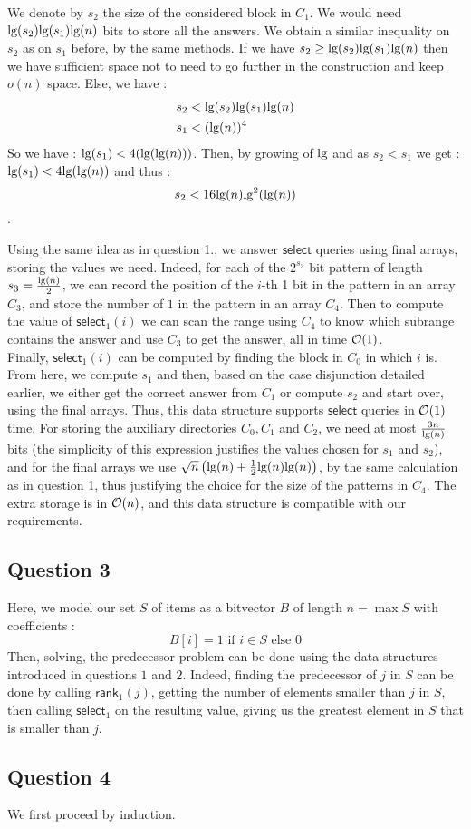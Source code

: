 \documentclass{cours}
\begin{document}
We denote by $s_{2}$ the size of the considered block in $C_{1}$. We would need $\textmd{lg}(s_{2})\textmd{lg}(s_{1})\textmd{lg}(n)$ bits to store all the answers. We obtain a similar inequality on $s_{2}$ as on $s_{1}$ before, by the same methods. If we have $s_{2} \geq \textmd{lg}(s_{2})\textmd{lg}(s_{1})\textmd{lg}(n)$ then we have sufficient space not to need to go further in the construction and keep $o(n)$ space. Else, we have : 
\[
    \begin{aligned}
        s_{2} &<\textmd{lg}(s_{2})\textmd{lg}(s_{1})\textmd{lg}(n)\\
        s_{1} &< (\textmd{lg}(n))^{4}
    \end{aligned}    
\]
So we have : $\textmd{lg}(s_{1}) < 4(\textmd{lg}(\textmd{lg}(n)))$. 
Then, by growing of $\textmd{lg}$ and as $s_{2} < s_{1}$ we get : $\textmd{lg}(s_{1}) < 4 \textmd{lg}(\textmd{lg}(n))$ and thus : \[s_{2} < 16 \textmd{lg}(n) \textmd{lg}^{2}(\textmd{lg}(n))\].

Using the same idea as in question 1., we answer $\textsf{select}$ queries using final arrays, storing the values we need. Indeed, for each of the $2^{s_{3}}$ bit pattern of length $s_{3} = \frac{\textmd{lg}(n)}{2}$, we can record the position of the $i$-th 1 bit in the pattern in an array $C_{3}$, and store the number of $1$ in the pattern in an array $C_{4}$. Then to compute the value of $\textsf{select}_{1}(i)$ we can scan the range using $C_{4}$ to know which subrange contains the answer and use $C_{3}$ to get the answer, all in time $\mathcal{O}(1)$.\\

Finally, $\textsf{select}_{1}(i)$ can be computed by finding the block in $C_{0}$ in which $i$ is. From here, we compute $s_{1}$ and then, based on the case disjunction detailed earlier, we either get the correct answer from $C_{1}$ or compute $s_{2}$ and start over, using the final arrays. Thus, this data structure supports $\textsf{select}$ queries in $\mathcal{O}(1)$ time. 
For storing the auxiliary directories $C_{0}, C_{1}$ and $C_{2}$, we need at most $\frac{3n}{\textmd{lg}(n)}$ bits (the simplicity of this expression justifies the values chosen for $s_{1}$ and $s_{2}$), and for the final arrays we use $\sqrt{n}\left(\textmd{lg}(n) + \frac{1}{2}\textmd{lg}(n)\textmd{lg}(n)\right)$, by the same calculation as in question 1, thus justifying the choice for the size of the patterns in $C_{4}$. The extra storage is in $\mathcal{O}(n)$, and this data structure is compatible with our requirements.

\subsection{Question 3}
Here, we model our set $S$ of items as a bitvector $B$ of length $n = \max S$ with coefficients : \[B[i] = 1 \text{ if } i \in S \text{ else } 0\]
Then, solving, the predecessor problem can be done using the data structures introduced in questions $1$ and $2$. Indeed, finding the predecessor of $j$ in $S$ can be done by calling $\textsf{rank}_{1}(j)$, getting the number of elements smaller than $j$ in $S$, then calling $\textsf{select}_{1}$ on the resulting value, giving us the greatest element in $S$ that is smaller than $j$. 

\subsection{Question 4}
We first proceed by induction. 
\end{document}

